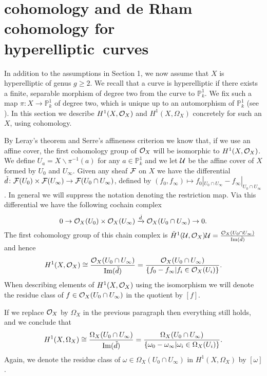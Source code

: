 \section{\cech cohomology and de Rham cohomology for {hyperelliptic}~curves}

In addition to the assumptions in Section 1, we now assume that $X$ is hyperelliptic of genus $g \geq 2$.
We recall that a curve is hyperelliptic if there exists a finite, separable morphism of degree two from the curve to $\mathbb P_k^1$.
We fix such a map $\pi \colon X \rightarrow \mathbb P_k^1$ of degree two, which is unique up to an automorphism of $\mathbb P_k^1$ (see \cite[Rem.\ 7.4.30]{liu}).
In this section we describe $H^1(X,\mathcal{O}_X)$ and $H^1(X,\Omega_X)$ concretely for such an $X$, using \cech cohomology.

By Leray's theorem \cite[Thm.\ 5.2.12]{liu} and Serre's affineness criterion \cite[Thm.\ 5.2.23]{liu} we know that, if we use an affine cover, the first \cech cohomology group of ${\cal O}_X$ will be isomorphic to $H^1(X,\mathcal{O}_X)$.
We define $U_a = X \backslash \pi^{-1}(a)$ for any $a \in \mathbb P_k^1$ and we let ${\cal U}$ be the affine cover of $X$ formed by $U_0$ and $U_\infty$.
Given any sheaf $\cal F$ on $X$ we have the \cech differential $\check{d}\colon {\cal F}(U_0) \times {\cal F} (U_\infty) \rightarrow {\cal F}(U_0 \cap U_\infty)$, defined by $(f_0,f_\infty) \mapsto f_0|_{U_0 \cap U_\infty} - f_\infty|_{U_0 \cap U_\infty}$.
In general we will suppress the notation denoting the restriction map.
Via this differential we have the following cochain complex
    \begin{equation*}
    0 \rightarrow {\cal O}_X(U_0)\times {\cal O}_X(U_\infty) \xrightarrow{\check{d}} {\cal O}_X(U_0 \cap U_\infty) \rightarrow 0.
    \end{equation*}
The first cohomology group of this chain complex is $\check{H}^1(\mathcal U,\mathcal O_X){\cal U} = \frac{{\cal O}_X(U_0 \cap U_\infty)}{\operatorname{Im}(\check{d})}$ and hence
    \begin{equation}\label{equationcechhoneisomorphismfunctions}
    H^1(X,\mathcal{O}_X) \cong \frac{{\cal O}_X(U_0 \cap U_\infty)}{\operatorname{Im}(\check{d})}  
     = \frac{{\cal O}_X(U_0 \cap U_\infty)}{\{f_0 - f_\infty | f_i \in {\cal O}_X(U_i) \}}.
    \end{equation}
When describing elements of $H^1(X,\mathcal{O}_X)$ using the isomorphism we will denote the residue class of $f \in {\cal O}_X(U_0 \cap U_\infty)$ in the quotient by $[f]$.

If we replace ${\cal O}_X$ by $\Omega_X$ in the previous paragraph then everything still holds, and we conclude that
    \begin{equation}\label{equationcechhoneisomorphismdifferentials}
    H^1(X,\Omega_X) \cong \frac{\Omega_X(U_0 \cap U_\infty)}{\operatorname{Im}(\check{d})} = \frac{\Omega_X(U_0 \cap U_\infty)}{\{\omega_0 - \omega_ \infty | \omega_i \in \Omega_X(U_i)\}}.
    \end{equation}
Again, we denote the residue class of $\omega \in \Omega_X(U_0 \cap U_\infty)$ in $H^1(X,\Omega_X)$ by $[\omega]$.

